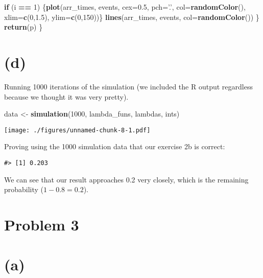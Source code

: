 \documentclass[]{article}
\newenvironment{Shaded}{\begin{snugshade}}{\end{snugshade}}
\newcommand{\ControlFlowTok}[1]{\textcolor[rgb]{0.13,0.29,0.53}{\textbf{#1}}}
\newcommand{\DataTypeTok}[1]{\textcolor[rgb]{0.13,0.29,0.53}{#1}}
\newcommand{\DecValTok}[1]{\textcolor[rgb]{0.00,0.00,0.81}{#1}}
\newcommand{\FloatTok}[1]{\textcolor[rgb]{0.00,0.00,0.81}{#1}}
\newcommand{\KeywordTok}[1]{\textcolor[rgb]{0.13,0.29,0.53}{\textbf{#1}}}
\newcommand{\NormalTok}[1]{#1}
\newcommand{\OperatorTok}[1]{\textcolor[rgb]{0.81,0.36,0.00}{\textbf{#1}}}
\newcommand{\StringTok}[1]{\textcolor[rgb]{0.31,0.60,0.02}{#1}}
\begin{document}
\begin{Shaded}
\begin{Highlighting}[]
        \ControlFlowTok{if}\NormalTok{ (i }\OperatorTok{==}\StringTok{ }\DecValTok{1}\NormalTok{) \{}\KeywordTok{plot}\NormalTok{(arr_times, events, }\DataTypeTok{cex=}\FloatTok{0.5}\NormalTok{, }\DataTypeTok{pch=}\StringTok{'.'}\NormalTok{, }
                          \DataTypeTok{col=}\KeywordTok{randomColor}\NormalTok{(), }\DataTypeTok{xlim=}\KeywordTok{c}\NormalTok{(}\DecValTok{0}\NormalTok{,}\FloatTok{1.5}\NormalTok{), }
                          \DataTypeTok{ylim=}\KeywordTok{c}\NormalTok{(}\DecValTok{0}\NormalTok{,}\DecValTok{150}\NormalTok{))\}}
        \KeywordTok{lines}\NormalTok{(arr_times, events, }\DataTypeTok{col=}\KeywordTok{randomColor}\NormalTok{())}
\NormalTok{    \}}
    \KeywordTok{return}\NormalTok{(p)}
\NormalTok{\}}
\end{Highlighting}
\end{Shaded}

\newpage

\hypertarget{d}{%
\section{(d)}\label{d}}

Running 1000 iterations of the simulation (we included the R output
regardless because we thought it was very pretty).

\begin{Shaded}
\begin{Highlighting}[]
\NormalTok{data <-}\StringTok{ }\KeywordTok{simulation}\NormalTok{(}\DecValTok{1000}\NormalTok{, lambda_funs, lambdas, ints)}
\end{Highlighting}
\end{Shaded}

\texttt{[image: ./figures/unnamed-chunk-8-1.pdf]}

Proving using the 1000 simulation data that our exercise 2b is correct:

\begin{verbatim}
#> [1] 0.203
\end{verbatim}

We can see that our result approaches 0.2 very closely, which is the
remaining probability (\(1-0.8 = 0.2\)).

\hypertarget{problem-3}{%
\section{Problem 3}\label{problem-3}}

\hypertarget{a-1}{%
\section{(a)}\label{a-1}}
\end{document}
